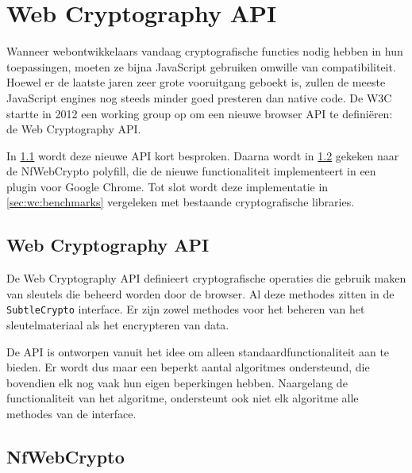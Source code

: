 % 
%

\chapter{Web Cryptography API}
\label{chap:web_cryptography_api}

Wanneer webontwikkelaars vandaag cryptografische functies nodig hebben in hun toepassingen, moeten ze bijna JavaScript gebruiken omwille van compatibiliteit. Hoewel er de laatste jaren zeer grote vooruitgang geboekt is, zullen de meeste JavaScript engines nog steeds minder goed presteren dan native code.\cite{site:resig_javascript_performance_rundown}\cite{site:cois_javascript_performance_rundown_2012}\cite{smedberg_performance_analysis_of_javascript} De W3C startte in 2012 een working group op om een nieuwe browser API te defini\"eren: de Web Cryptography API.\cite{wiki:webcrypto}

\npar In \ref{sec:wc:web_cryptography_api} wordt deze nieuwe API kort besproken. Daarna wordt in \ref{sec:wc:nfwebcrypto} gekeken naar de NfWebCrypto polyfill, die de nieuwe functionaliteit implementeert in een plugin voor Google Chrome. Tot slot wordt deze implementatie in \ref{sec:wc:benchmarks} vergeleken met bestaande cryptografische libraries.

\section{Web Cryptography API~\cite{sleevi_watson_web_cryptography_api}}
\label{sec:wc:web_cryptography_api}

De Web Cryptography API definieert cryptografische operaties die gebruik maken van sleutels die beheerd worden door de browser. Al deze methodes zitten in de \texttt{SubtleCrypto} interface. Er zijn zowel methodes voor het beheren van het sleutelmateriaal als het encrypteren van data.

\npar De API is ontworpen vanuit het idee om alleen standaardfunctionaliteit aan te bieden. Er wordt dus maar een beperkt aantal algoritmes ondersteund, die bovendien elk nog vaak hun eigen beperkingen hebben.\cite{mail:sleevi_algorithms_and_referenced_documents} Naargelang de functionaliteit van het algoritme, ondersteunt ook niet elk algoritme alle methodes van de interface.

\section{NfWebCrypto}
\label{sec:wc:nfwebcrypto}

